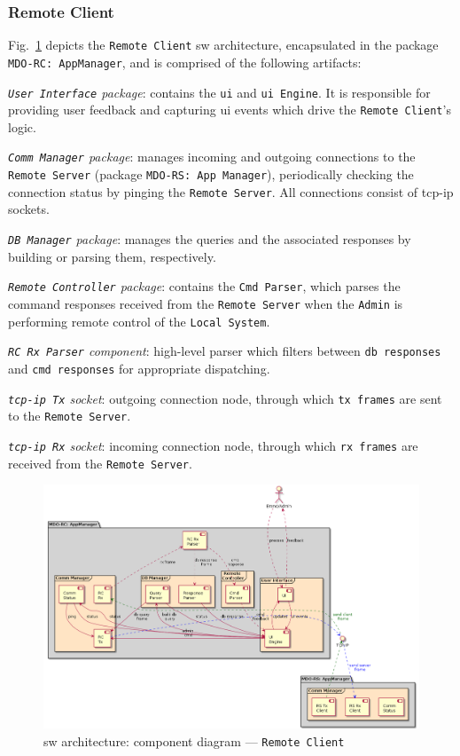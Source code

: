 \subsubsection{Remote Client}
\label{sec:remote-client-arch}
Fig.~\ref{fig:component-diag-rc} depicts the \texttt{Remote Client} \gls{sw} architecture, encapsulated in the package
\texttt{MDO-RC: AppManager}, and is comprised of the following artifacts:
\begin{item-c}
\item
  \emph{\texttt{User Interface} package}: contains the \texttt{\gls{ui}} and
  \texttt{\gls{ui} Engine}. It is responsible for providing user feedback and
  capturing \gls{ui} events which drive the \texttt{Remote Client}'s logic.
\item
  \emph{\texttt{Comm Manager} package}: manages incoming and outgoing
  connections to the \texttt{Remote Server} (package \texttt{MDO-RS: App Manager}), periodically checking the
  connection status by pinging the \texttt{Remote Server}. All connections
  consist of \gls{tcp-ip} sockets.
\item
  \emph{\texttt{DB Manager} package}: manages the queries and the associated
  responses by building or parsing them, respectively.
\item 
  \emph{\texttt{Remote Controller} package}: contains the \texttt{Cmd Parser},
  which parses the command responses received from the \texttt{Remote Server}
  when the \texttt{Admin} is performing remote control of the \texttt{Local
    System}.
\item
  \emph{\texttt{RC Rx Parser} component}: high-level parser which filters
  between \texttt{db responses} and \texttt{cmd responses} for appropriate
  dispatching.
\item
  \emph{\texttt{\gls{tcp-ip} Tx} socket}: outgoing connection node, through
  which \texttt{tx frames} are sent to the \texttt{Remote Server}.
\item 
  \emph{\texttt{\gls{tcp-ip} Rx} socket}:  incoming connection node, through
  which \texttt{rx frames} are received from the \texttt{Remote
    Server}.
\end{item-c}

\begin{figure}[htb!]
\centering
    \includegraphics[width=0.9\columnwidth]{./img/component-diag-rc.png}
  \caption{\gls{sw} architecture: component diagram --- \texttt{Remote Client}}%
\label{fig:component-diag-rc}
\end{figure}

